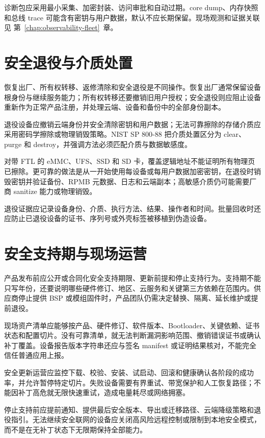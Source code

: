 诊断包应采用最小采集、加密封装、访问审批和自动过期。core dump、内存快照和总线 trace 可能含有密钥与用户数据，默认不应长期保留。现场观测和证据关联见 \mbox{第~\ref{chap:observability-fleet}~章}。

\section{安全退役与介质处置}

恢复出厂、所有权转移、返修清除和安全退役是不同操作。恢复出厂通常保留设备根身份与继续服务能力；所有权转移还要撤销旧用户授权；安全退役则应阻止设备重新作为正常产品注册，并处理云端、设备和备份中的全部身份副本。

退役设备应撤销云端身份并安全清除密钥和用户数据；无法可靠擦除的存储介质应采用密码学擦除或物理销毁策略。NIST SP 800-88 把介质处置区分为 clear、purge 和 destroy，并强调方法必须匹配介质与数据敏感度\cite{nist-media-sanitization}。

对带 FTL 的 eMMC、UFS、SSD 和 SD 卡，覆盖逻辑地址不能证明所有物理页已擦除。更可靠的做法是从一开始使用每设备或每用户数据加密密钥，在退役时销毁密钥并验证备份、RPMB 元数据、日志和云端副本；高敏感介质仍可能需要厂商 sanitize 能力或物理销毁。

退役证据应记录设备身份、介质、执行方法、结果、操作者和时间。批量回收时还应防止已退役设备的证书、序列号或外壳标签被移植到伪造设备。

\section{安全支持期与现场运营}

产品发布前应公开或合同化安全支持期限、更新前提和停止支持行为。支持期不能只写年份，还要说明哪些硬件修订、地区、云服务和关键第三方依赖在范围内。供应商停止提供 BSP 或模组固件时，产品团队仍需决定替换、隔离、延长维护或提前退役。

现场资产清单应能够按产品、硬件修订、软件版本、Bootloader、关键依赖、证书状态和配置切片。没有可靠清单，就无法判断漏洞影响范围、撤销错误证书或确认补丁覆盖。设备报告版本字符串还应与签名 manifest 或证明结果核对，不能完全信任普通应用上报。

安全更新运营应监控下载、校验、安装、试启动、回滚和健康确认各阶段的成功率，并允许暂停特定切片。失败设备需要有界重试、带宽保护和人工恢复路径；不能因补丁高危就无限快速重试，造成电量耗尽或网络拥塞。

停止支持前应提前通知、提供最后安全版本、导出或迁移路径、云端降级策略和退役指引。无法继续安全联网的设备应关闭高风险远程控制或限制到本地安全模式，而不是在无补丁状态下无限期保持全部能力。

